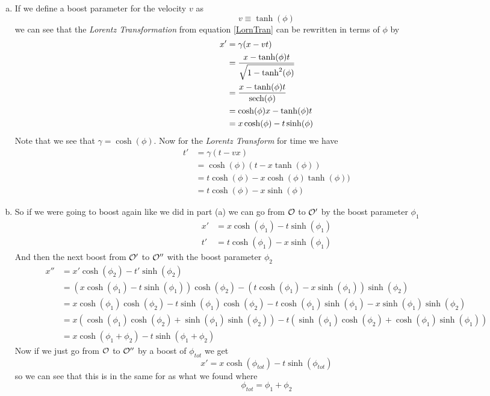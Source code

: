 \documentclass[11pt]{article}
\numberwithin{equation}{section}
\begin{document}
\begin{enumerate}[(a)]
\item
If we define a boost parameter for the velocity $v$ as
$$v\equiv \tanh(\phi)$$
we can see that the \emph{Lorentz Transformation} from equation \ref{LornTran} can be rewritten in terms of $\phi$ by
\begin{align*}
x' &= \gamma(x - vt)\\
&= \frac{x - \tanh(\phi)t}{\sqrt{1-\tanh^2(\phi)}}\\
&= \frac{x - \tanh(\phi)t}{\textnormal{sech}(\phi)}\\
&= \cosh(\phi){x - \tanh(\phi)t}\\
&= x\cosh(\phi) - t\sinh(\phi)
\end{align*}
Note that we see that $\gamma = \cosh(\phi)$. Now for the \emph{Lorentz Transform} for time we have
\begin{align*}
t' &= \gamma(t-vx)\\
&= \cosh(\phi)(t-x\tanh(\phi))\\
&= t\cosh(\phi)-x\cosh(\phi)\tanh(\phi))\\
&= t\cosh(\phi)-x\sinh(\phi)
\end{align*}

\item
So if we were going to boost again like we did in part (a) we can go from $\mathcal{O}$ to $\mathcal{O}'$ by the boost parameter $\phi_1$
\begin{align*}
x' &= x\cosh(\phi_1) - t\sinh(\phi_1)\\
t' &= t\cosh(\phi_1)-x\sinh(\phi_1)
\end{align*}
And then the next boost from $\mathcal{O}'$ to $\mathcal{O}''$ with the boost parameter $\phi_2$
\begin{align*}
x'' &= x'\cosh(\phi_2) - t'\sinh(\phi_2)\\
&= (x\cosh(\phi_1) - t\sinh(\phi_1))\cosh(\phi_2) - (t\cosh(\phi_1)-x\sinh(\phi_1))\sinh(\phi_2)\\
&= x\cosh(\phi_1)\cosh(\phi_2) - t\sinh(\phi_1)\cosh(\phi_2) - t\cosh(\phi_1)\sinh(\phi_1)-x\sinh(\phi_1)\sinh(\phi_2)\\
&= x(\cosh(\phi_1)\cosh(\phi_2) + \sinh(\phi_1)\sinh(\phi_2))  - t(\sinh(\phi_1)\cosh(\phi_2)+ \cosh(\phi_1)\sinh(\phi_1))\\
&= x\cosh(\phi_1+\phi_2) - t\sinh(\phi_1+\phi_2)
\end{align*}
Now if we just go from $\mathcal{O}$ to $\mathcal{O}''$ by a boost of $\phi_{tot}$ we get
$$x' = x\cosh(\phi_{tot}) - t\sinh(\phi_{tot})$$
so we can see that this is in the same for as what we found where
$$\phi_{tot} = \phi_1+\phi_2$$


\end{enumerate}
\end{document}
